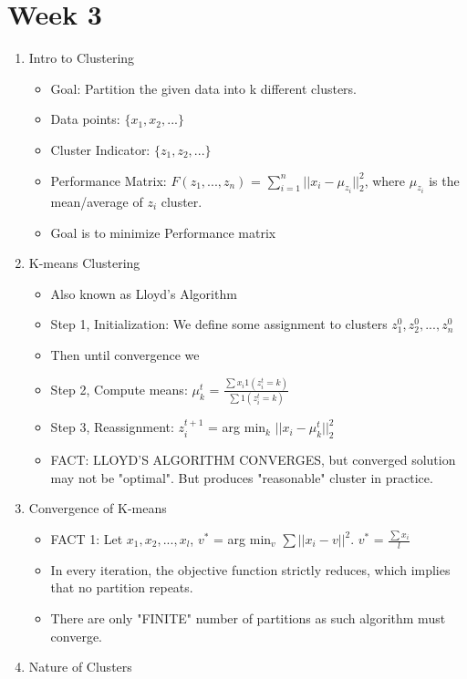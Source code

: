 \documentclass[a4paper]{article}
\begin{document}
\section{Week 3}
\begin{enumerate}
    \item Intro to Clustering
    \begin{itemize}
        \item Goal: Partition the given data into k different clusters.
        \item Data points: $\{x_1, x_2, ...\}$
        \item Cluster Indicator: $\{z_1, z_2, ...\}$
        \item Performance Matrix: $F(z_1, ..., z_n)$ = $\sum_{i=1}^n||x_i - \mu_{z_i}||^2_2$, where $\mu_{z_i}$ is the mean/average of $z_i$ cluster.
        \item Goal is to minimize Performance matrix
    \end{itemize}
    \item K-means Clustering
    \begin{itemize}
        \item Also known as Lloyd's Algorithm
        \item Step 1, Initialization: We define some assignment to clusters $z_1^0, z_2^0, ..., z_n^0$
        \item Then until convergence we
        \item Step 2, Compute means: $\mu_k^t$ = $\frac{\sum x_i1(z_i^t=k)}{\sum 1(z_i^t=k)}$
        \item Step 3, Reassignment: $z_i^{t+1}$ = arg min$_k$ $||x_i - \mu_k^t||^2_2$
        \item FACT: LLOYD'S ALGORITHM CONVERGES, but converged solution may not be "optimal". But produces "reasonable" cluster in practice.
    \end{itemize}
    \item Convergence of K-means
    \begin{itemize}
        \item FACT 1: Let $x_1,x_2,...,x_l$, $v^*$ = arg min$_v$ $\sum ||x_i - v||^2$. $v^*$ = $\frac{\sum x_i}{l}$
        \item In every iteration, the objective function strictly reduces, which implies that no partition repeats.
        \item There are only "FINITE" number of partitions as such algorithm must converge.
    \end{itemize}
    \item Nature of Clusters

\end{enumerate}
\end{document}
